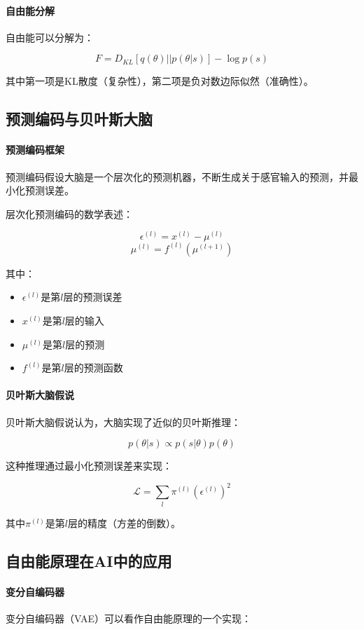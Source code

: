 \paragraph{自由能分解}
自由能可以分解为：

$$F = D_{KL}[q(\theta)||p(\theta|s)] - \log p(s)$$

其中第一项是KL散度（复杂性），第二项是负对数边际似然（准确性）。

\subsection{预测编码与贝叶斯大脑}

\paragraph{预测编码框架}
预测编码假设大脑是一个层次化的预测机器，不断生成关于感官输入的预测，并最小化预测误差。

层次化预测编码的数学表述：

$$\epsilon^{(l)} = x^{(l)} - \mu^{(l)}$$
$$\mu^{(l)} = f^{(l)}(\mu^{(l+1)})$$

其中：
\begin{itemize}
\item $\epsilon^{(l)}$是第$l$层的预测误差
\item $x^{(l)}$是第$l$层的输入
\item $\mu^{(l)}$是第$l$层的预测
\item $f^{(l)}$是第$l$层的预测函数
\end{itemize}

\paragraph{贝叶斯大脑假说}
贝叶斯大脑假说认为，大脑实现了近似的贝叶斯推理：

$$p(\theta|s) \propto p(s|\theta) p(\theta)$$

这种推理通过最小化预测误差来实现：

$$\mathcal{L} = \sum_{l} \pi^{(l)} (\epsilon^{(l)})^2$$

其中$\pi^{(l)}$是第$l$层的精度（方差的倒数）。

\subsection{自由能原理在AI中的应用}

\paragraph{变分自编码器}
变分自编码器（VAE）可以看作自由能原理的一个实现：

